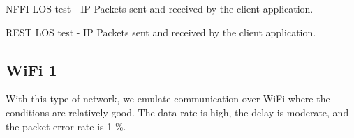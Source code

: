 \begin{landscape}
    \begin{figure}
    \centering
    \begin{floatrow}
    \end{floatrow}
    \end{figure}
\end{landscape}

\begin{table}[h]

\caption{NFFI LOS test - IP Packets sent and received by the client application.}
\label{table:los-test-packets-nffi}
\end{table}

\begin{table}[h]

\caption{REST LOS test - IP Packets sent and received by the client application.}
\label{table:los-test-packets-rest}
\end{table}




\subsection{WiFi 1}

With this type of network, we emulate communication over WiFi where the
conditions are relatively good. The data rate is high, the delay is moderate,
and the packet error rate is 1 \%.

